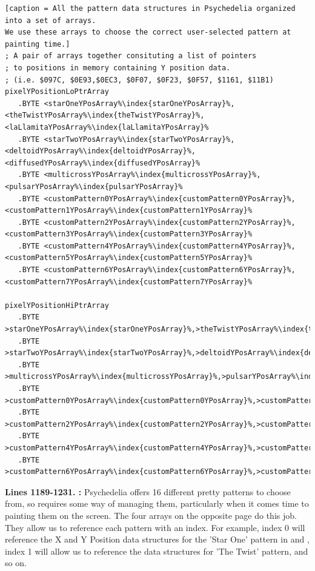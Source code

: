 \begin{lstlisting}[escapechar=\%][caption = All the pattern data structures in Psychedelia organized into a set of arrays. 
We use these arrays to choose the correct user-selected pattern at painting time.]
; A pair of arrays together consituting a list of pointers
; to positions in memory containing Y position data.
; (i.e. $097C, $0E93,$0EC3, $0F07, $0F23, $0F57, $1161, $11B1)
pixelYPositionLoPtrArray 
   .BYTE <starOneYPosArray%\index{starOneYPosArray}%,<theTwistYPosArray%\index{theTwistYPosArray}%,<laLlamitaYPosArray%\index{laLlamitaYPosArray}%
   .BYTE <starTwoYPosArray%\index{starTwoYPosArray}%,<deltoidYPosArray%\index{deltoidYPosArray}%,<diffusedYPosArray%\index{diffusedYPosArray}%
   .BYTE <multicrossYPosArray%\index{multicrossYPosArray}%,<pulsarYPosArray%\index{pulsarYPosArray}%
   .BYTE <customPattern0YPosArray%\index{customPattern0YPosArray}%,<customPattern1YPosArray%\index{customPattern1YPosArray}%
   .BYTE <customPattern2YPosArray%\index{customPattern2YPosArray}%,<customPattern3YPosArray%\index{customPattern3YPosArray}%
   .BYTE <customPattern4YPosArray%\index{customPattern4YPosArray}%,<customPattern5YPosArray%\index{customPattern5YPosArray}%
   .BYTE <customPattern6YPosArray%\index{customPattern6YPosArray}%,<customPattern7YPosArray%\index{customPattern7YPosArray}%

pixelYPositionHiPtrArray 
   .BYTE >starOneYPosArray%\index{starOneYPosArray}%,>theTwistYPosArray%\index{theTwistYPosArray}%,>laLlamitaYPosArray%\index{laLlamitaYPosArray}%
   .BYTE >starTwoYPosArray%\index{starTwoYPosArray}%,>deltoidYPosArray%\index{deltoidYPosArray}%,>diffusedYPosArray%\index{diffusedYPosArray}%
   .BYTE >multicrossYPosArray%\index{multicrossYPosArray}%,>pulsarYPosArray%\index{pulsarYPosArray}%
   .BYTE >customPattern0YPosArray%\index{customPattern0YPosArray}%,>customPattern1YPosArray%\index{customPattern1YPosArray}%
   .BYTE >customPattern2YPosArray%\index{customPattern2YPosArray}%,>customPattern3YPosArray%\index{customPattern3YPosArray}%
   .BYTE >customPattern4YPosArray%\index{customPattern4YPosArray}%,>customPattern5YPosArray%\index{customPattern5YPosArray}%
   .BYTE >customPattern6YPosArray%\index{customPattern6YPosArray}%,>customPattern7YPosArray%\index{customPattern7YPosArray}%

\end{lstlisting}
\clearpage

\textbf{Lines 1189-1231. :} Psychedelia
offers 16 different pretty patterns to choose from, so requires some way of managing them, particularly
when it comes time to painting them on the screen. The four arrays on the opposite page do this job.
They allow us to reference each pattern with an index. For example, index 0 will reference the X and
Y Position data structures for the 'Star One' pattern in  and 
, index 1 will allow us to reference the data structures for 'The Twist' pattern,
and so on.

